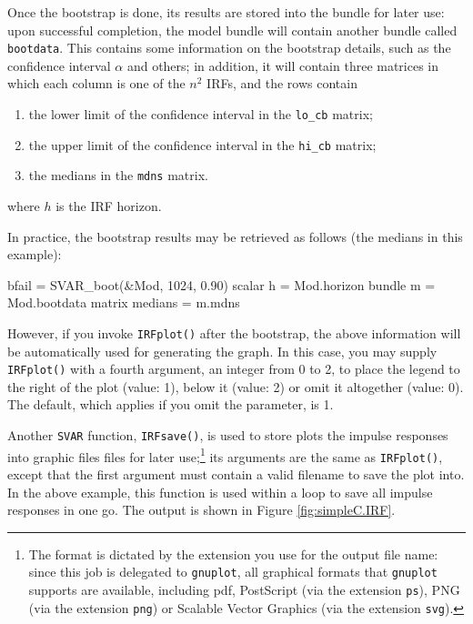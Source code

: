 \documentclass[a4paper,10pt]{article}
\begin{document}
Once the bootstrap is done, its results are stored into the bundle for
later use: upon successful completion, the model bundle will
contain another bundle called
\texttt{bootdata}. This contains some information on the bootstrap
details, such as the confidence interval $\alpha$ and others; in
addition, it will contain three matrices in which each column is one
of the $n^2$ IRFs, and the rows contain
\begin{enumerate}
\item the lower limit of the confidence interval in the
  \texttt{lo\_cb} matrix;
\item the upper limit of the confidence interval in the
  \texttt{hi\_cb} matrix;
\item the medians in the \texttt{mdns} matrix.
\end{enumerate}
where $h$ is the IRF horizon.

In practice, the bootstrap results may be retrieved as follows (the
medians in this example):
\begin{code}
  bfail = SVAR_boot(&Mod, 1024, 0.90)
  scalar h = Mod.horizon
  bundle m = Mod.bootdata
  matrix medians = m.mdns
\end{code}

However, if you invoke \texttt{IRFplot()} after the bootstrap, the
above information will be automatically used for generating the
graph. In this case, you may supply \texttt{IRFplot()} with a fourth
argument, an integer from 0 to 2, to place the legend to the right of
the plot (value: 1), below it (value: 2) or omit it altogether (value:
0). The default, which applies if you omit the parameter, is 1.

Another \texttt{SVAR} function, \texttt{IRFsave()}, is used to
store plots the impulse responses into graphic files files for later
use;\footnote{The format is dictated by the extension you use for the
  output file name: since this job is delegated to \texttt{gnuplot},
  all graphical formats that \texttt{gnuplot} supports are available,
  including pdf, PostScript (via the extension \texttt{ps}), PNG (via
  the extension \texttt{png}) or Scalable Vector Graphics (via the
  extension \texttt{svg}). } its arguments are the same as
\texttt{IRFplot()}, except that the first argument must contain a
valid filename to save the plot into. In the above example, this
function is used within a loop to save all impulse responses in one
go. The output is shown in Figure \ref{fig:simpleC.IRF}.
\end{document}
